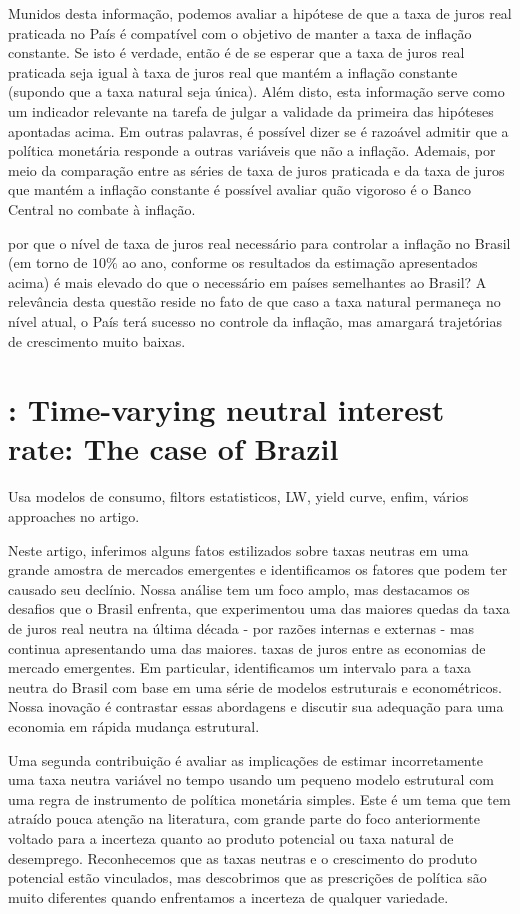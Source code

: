 Munidos desta informação, podemos avaliar a hipótese de que a taxa de juros real praticada no País é compatível com o objetivo de manter a taxa de inflação constante. Se isto é verdade, então é de se esperar que a taxa de juros real praticada seja igual à taxa de juros real que mantém a inflação constante (supondo que a taxa natural seja única). Além disto, esta informação serve como um indicador relevante na tarefa de julgar a validade da primeira das hipóteses apontadas acima. Em outras palavras, é possível dizer se é razoável admitir que a política monetária responde a outras variáveis que não a inflação. Ademais, por meio da comparação entre as séries de taxa de juros praticada e da taxa de juros que mantém a inflação constante é possível avaliar quão vigoroso é o
Banco Central no combate à inflação.

por que o nível de taxa de juros real necessário para controlar a inflação no Brasil (em torno de $10\%$ ao ano, conforme os resultados da estimação
apresentados acima) é mais elevado do que o necessário em países semelhantes ao Brasil? A relevância desta questão reside no fato de que caso a taxa natural permaneça no nível atual, o País terá sucesso no controle da inflação, mas amargará trajetórias de crescimento muito baixas. 
%
%
\section{\citet{Perrelli:2014}: Time-varying neutral interest rate: The case of Brazil}

Usa modelos de consumo, filtors estatisticos, LW, yield curve, enfim, vários approaches no artigo.

Neste artigo, inferimos alguns fatos estilizados sobre taxas neutras em uma grande amostra de mercados emergentes e identificamos os fatores que podem ter causado seu declínio. Nossa análise tem um foco amplo, mas destacamos os desafios que o Brasil enfrenta, que experimentou uma das maiores quedas da taxa de juros real neutra na última década - por razões internas e externas - mas continua apresentando uma das maiores. taxas de juros entre as economias de mercado emergentes. Em particular, identificamos um intervalo para a taxa neutra do Brasil com base em uma série de modelos estruturais e econométricos. Nossa inovação é contrastar essas abordagens e discutir sua adequação para uma economia em rápida mudança estrutural.

Uma segunda contribuição é avaliar as implicações de estimar incorretamente uma taxa neutra variável no tempo usando um pequeno modelo estrutural com uma regra de instrumento de política monetária simples. Este é um tema que tem atraído pouca atenção na literatura, com grande parte do foco anteriormente voltado para a incerteza quanto ao produto potencial ou taxa natural de desemprego. Reconhecemos que as taxas neutras e o crescimento do produto potencial estão vinculados, mas descobrimos que as prescrições de política são muito diferentes quando enfrentamos a incerteza de qualquer variedade.

